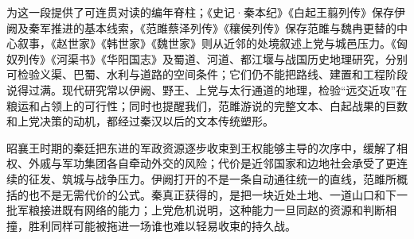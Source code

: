 \begin{sourcenote}[从人物传记到战争地理]
为这一段提供了可连贯对读的编年脊柱；《史记·秦本纪》《白起王翦列传》保存伊阙及秦军推进的基本线索，《范雎蔡泽列传》《穰侯列传》保存范雎与魏冉更替的中心叙事，《赵世家》《韩世家》《魏世家》则从近邻的处境叙述上党与城邑压力。《匈奴列传》《河渠书》《华阳国志》及蜀道、河道、都江堰与战国历史地理研究，分别可检验义渠、巴蜀、水利与道路的空间条件；它们仍不能把路线、建置和工程阶段说得过满。现代研究常以伊阙、野王、上党与太行通道的地理，检验“远交近攻”在粮运和占领上的可行性；同时也提醒我们，范雎游说的完整文本、白起战果的巨数和上党决策的动机，都经过秦汉以后的文本传统塑形。
\end{sourcenote}

\begin{turningpoint}
昭襄王时期的秦廷把东进的军政资源逐步收束到王权能够主导的次序中，缓解了相权、外戚与军功集团各自牵动外交的风险；代价是近邻国家和边地社会承受了更连续的征发、筑城与战争压力。伊阙打开的不是一条自动通往统一的直线，范雎所概括的也不是无需代价的公式。秦真正获得的，是把一块近处土地、一道山口和下一批军粮接进既有网络的能力；上党危机说明，这种能力一旦同赵的资源和判断相撞，胜利同样可能被拖进一场谁也难以轻易收束的持久战。
\end{turningpoint}

